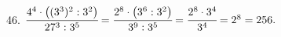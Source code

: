 46. $\cfrac{4^4\cdot\left((3^3)^2: 3^2\right)}{27^3:3^5}=\cfrac{2^8\cdot\left(3^6:3^2\right)}{3^9:3^5}=
\cfrac{2^8\cdot3^4}{3^4}=2^8=256.$\\
